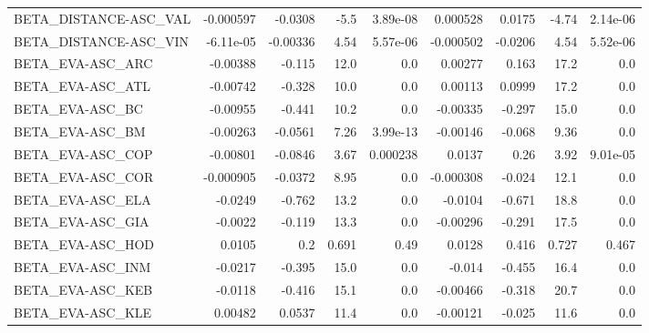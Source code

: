 \begin{tabular}{lrrrrrrrr}
BETA\_DISTANCE-ASC\_VAL                   &   -0.000597 &      -0.0308 &    -5.5 & 3.89e-08 &   0.000528 &      0.0175 &        -4.74 &      2.14e-06 \\
BETA\_DISTANCE-ASC\_VIN                   &   -6.11e-05 &     -0.00336 &    4.54 & 5.57e-06 &  -0.000502 &     -0.0206 &         4.54 &      5.52e-06 \\
BETA\_EVA-ASC\_ARC                        &    -0.00388 &       -0.115 &    12.0 &      0.0 &    0.00277 &       0.163 &         17.2 &           0.0 \\
BETA\_EVA-ASC\_ATL                        &    -0.00742 &       -0.328 &    10.0 &      0.0 &    0.00113 &      0.0999 &         17.2 &           0.0 \\
BETA\_EVA-ASC\_BC                         &    -0.00955 &       -0.441 &    10.2 &      0.0 &   -0.00335 &      -0.297 &         15.0 &           0.0 \\
BETA\_EVA-ASC\_BM                         &    -0.00263 &      -0.0561 &    7.26 & 3.99e-13 &   -0.00146 &      -0.068 &         9.36 &           0.0 \\
BETA\_EVA-ASC\_COP                        &    -0.00801 &      -0.0846 &    3.67 & 0.000238 &     0.0137 &        0.26 &         3.92 &      9.01e-05 \\
BETA\_EVA-ASC\_COR                        &   -0.000905 &      -0.0372 &    8.95 &      0.0 &  -0.000308 &      -0.024 &         12.1 &           0.0 \\
BETA\_EVA-ASC\_ELA                        &     -0.0249 &       -0.762 &    13.2 &      0.0 &    -0.0104 &      -0.671 &         18.8 &           0.0 \\
BETA\_EVA-ASC\_GIA                        &     -0.0022 &       -0.119 &    13.3 &      0.0 &   -0.00296 &      -0.291 &         17.5 &           0.0 \\
BETA\_EVA-ASC\_HOD                        &      0.0105 &          0.2 &   0.691 &     0.49 &     0.0128 &       0.416 &        0.727 &         0.467 \\
BETA\_EVA-ASC\_INM                        &     -0.0217 &       -0.395 &    15.0 &      0.0 &     -0.014 &      -0.455 &         16.4 &           0.0 \\
BETA\_EVA-ASC\_KEB                        &     -0.0118 &       -0.416 &    15.1 &      0.0 &   -0.00466 &      -0.318 &         20.7 &           0.0 \\
BETA\_EVA-ASC\_KLE                        &     0.00482 &       0.0537 &    11.4 &      0.0 &   -0.00121 &      -0.025 &         11.6 &           0.0 \\

\end{tabular}
